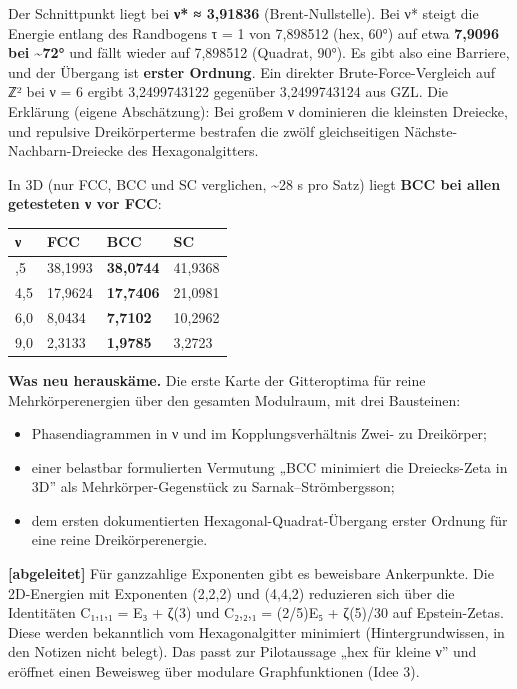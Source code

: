 Der Schnittpunkt liegt bei \textbf{ν* ≈ 3,91836} (Brent-Nullstelle). Bei ν* steigt die Energie entlang des Randbogens \textbar τ\textbar{} = 1 von 7,898512 (hex, 60°) auf etwa \textbf{7,9096 bei \textasciitilde72°} und fällt wieder auf 7,898512 (Quadrat, 90°). Es gibt also eine Barriere, und der Übergang ist \textbf{erster Ordnung}. Ein direkter Brute-Force-Vergleich auf ℤ² bei ν = 6 ergibt 3,2499743122 gegenüber 3,2499743124 aus GZL. Die Erklärung (eigene Abschätzung): Bei großem ν dominieren die kleinsten Dreiecke, und repulsive Dreikörperterme bestrafen die zwölf gleichseitigen Nächste-Nachbarn-Dreiecke des Hexagonalgitters.

In 3D (nur FCC, BCC und SC verglichen, \textasciitilde28 s pro Satz) liegt \textbf{BCC bei allen getesteten ν vor FCC}:

\begin{longtable}[]{@{}llll@{}}
\toprule\noalign{}
ν & FCC & BCC & SC \\
\midrule\noalign{}
\endhead
\bottomrule\noalign{}
\endlastfoot
3,5 & 38,1993 & \textbf{38,0744} & 41,9368 \\
4,5 & 17,9624 & \textbf{17,7406} & 21,0981 \\
6,0 & 8,0434 & \textbf{7,7102} & 10,2962 \\
9,0 & 2,3133 & \textbf{1,9785} & 3,2723 \\
\end{longtable}

\textbf{Was neu herauskäme.} Die erste Karte der Gitteroptima für reine Mehrkörperenergien über den gesamten Modulraum, mit drei Bausteinen:

\begin{itemize}
\tightlist
\item
  Phasendiagrammen in ν und im Kopplungsverhältnis Zwei- zu Dreikörper;
\item
  einer belastbar formulierten Vermutung „BCC minimiert die Dreiecks-Zeta in 3D'' als Mehrkörper-Gegenstück zu Sarnak--Strömbergsson;
\item
  dem ersten dokumentierten Hexagonal-Quadrat-Übergang erster Ordnung für eine reine Dreikörperenergie.
\end{itemize}

\textbf{{[}abgeleitet{]}} Für ganzzahlige Exponenten gibt es beweisbare Ankerpunkte. Die 2D-Energien mit Exponenten (2,2,2) und (4,4,2) reduzieren sich über die Identitäten C₁,₁,₁ = E₃ + ζ(3) und C₂,₂,₁ = (2/5)E₅ + ζ(5)/30 auf Epstein-Zetas. Diese werden bekanntlich vom Hexagonalgitter minimiert (Hintergrundwissen, in den Notizen nicht belegt). Das passt zur Pilotaussage „hex für kleine ν'' und eröffnet einen Beweisweg über modulare Graphfunktionen (Idee 3).

